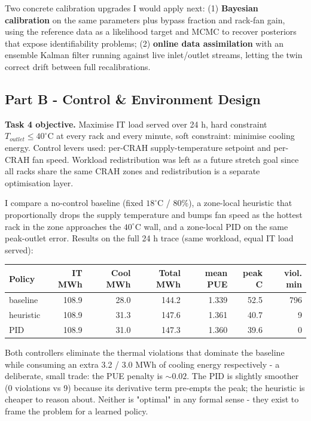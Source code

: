 \documentclass[letterpaper,11pt]{article}
\begin{document}
	Two concrete calibration upgrades I would apply next: 
	(1) \textbf{Bayesian calibration} on the same parameters plus bypass fraction and rack-fan gain, using the reference data as a likelihood target and MCMC to recover posteriors that expose identifiability problems; 
	(2) \textbf{online data assimilation} with an ensemble Kalman filter running against live inlet/outlet streams, letting the twin correct drift between full recalibrations.
	
	\subsection{Part B - Control \& Environment Design}
	\textbf{Task 4 objective.} Maximise IT load served over 24 h, hard constraint $T_{outlet} \leq 40^\circ\text{C}$ at every rack and every minute, soft constraint: minimise cooling energy. Control levers used: per-CRAH supply-temperature setpoint and per-CRAH fan speed. Workload redistribution was left as a future stretch goal since all racks share the same CRAH zones and redistribution is a separate optimisation layer.
	
	I compare a no-control baseline (fixed $18^\circ\text{C}$ / $80\%$), a zone-local heuristic that proportionally drops the supply temperature and bumps fan speed as the hottest rack in the zone approaches the $40^\circ\text{C}$ wall, and a zone-local PID on the same peak-outlet error. Results on the full 24 h trace (same workload, equal IT load served):
	
	\vspace{4pt}
	\begin{tabular}{lrrrrrr}
		\hline
		\rowcolor{lightgray} \textbf{Policy} & \textbf{IT MWh} & \textbf{Cool MWh} & \textbf{Total MWh} & \textbf{mean PUE} & \textbf{peak C} & \textbf{viol. min} \\ \hline
		baseline & 108.9 & 28.0 & 144.2 & 1.339 & 52.5 & 796 \\
		heuristic & 108.9 & 31.3 & 147.6 & 1.361 & 40.7 & 9 \\
		PID & 108.9 & 31.0 & 147.3 & 1.360 & 39.6 & 0 \\ \hline
	\end{tabular}
	\vspace{6pt}
	
	Both controllers eliminate the thermal violations that dominate the baseline while consuming an extra 3.2 / 3.0 MWh of cooling energy respectively - a deliberate, small trade: the PUE penalty is $\sim 0.02$. The PID is slightly smoother (0 violations vs 9) because its derivative term pre-empts the peak; the heuristic is cheaper to reason about. Neither is "optimal" in any formal sense - they exist to frame the problem for a learned policy.
	
\end{document}
